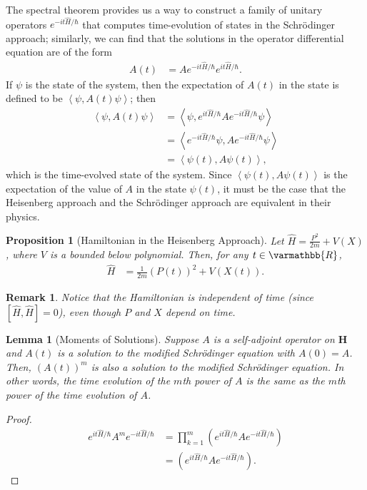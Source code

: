 \documentclass[12pt]{extarticle}
\newtheorem*{remark}{Remark}
\newcommand{\R}{\varmathbb{R}}
\newcommand{\iprod}[2]{\left\langle #1,#2\right\rangle}
\theoremstyle{plain}
\newtheorem*{lemma}{Lemma}%
\newtheorem*{proposition}{Proposition}%
\theoremstyle{definition}
\theoremstyle{remark}
\begin{document}
  The spectral theorem provides us a way to construct a family of unitary operators $e^{-it\hat{H}/\hbar}$ that computes time-evolution of states in the Schrödinger approach; similarly, we can find that the solutions in the operator differential equation are of the form
  \begin{align*}
    A(t) &= Ae^{-it\hat{H}/\hbar}e^{it\hat{H}/\hbar}.
  \end{align*}
  If $\psi$ is the state of the system, then the expectation of $A(t)$ in the state is defined to be $\iprod{\psi}{A(t)\psi}$; then
  \begin{align*}
    \iprod{\psi}{A(t)\psi} &= \iprod{\psi}{e^{it\hat{H}/\hbar}Ae^{-it\hat{H}/\hbar}\psi}\\
                           &= \iprod{e^{-it\hat{H}/\hbar}\psi}{Ae^{-it\hat{H}/\hbar}\psi}\\
                           &= \iprod{\psi(t)}{A\psi(t)},
  \end{align*}
  which is the time-evolved state of the system. Since $\iprod{\psi(t)}{A\psi(t)}$ is the expectation of the value of $A$ in the state $\psi(t)$, it must be the case that the Heisenberg approach and the Schrödinger approach are equivalent in their physics.
  \begin{proposition}[Hamiltonian in the Heisenberg Approach]
    Let $\hat{H} = \frac{P^2}{2m} + V(X)$, where $V$ is a bounded below polynomial. Then, for any $t\in \R$,
    \begin{align*}
      \hat{H} &= \frac{1}{2m}\left(P(t)\right)^2 + V(X(t)).
    \end{align*}
  \end{proposition}
  \begin{remark}
    Notice that the Hamiltonian is independent of time (since $[\hat{H},\hat{H}] = 0$), even though $P$ and $X$ depend on time.
  \end{remark}
  \begin{lemma}[Moments of Solutions]
    Suppose $A$ is a self-adjoint operator on $\mathbf{H}$ and $A(t)$ is a solution to the modified Schrödinger equation with $A(0) = A$. Then, $\left(A(t)\right)^m$ is also a solution to the modified Schrödinger equation. In other words, the time evolution of the $m$th power of $A$ is the same as the $m$th power of the time evolution of $A$.
  \end{lemma}
  \begin{proof}
    \begin{align*}
      e^{it\hat{H}/\hbar}A^{m}e^{-it\hat{H}/\hbar} &= \prod_{k=1}^{m}\left(e^{it\hat{H}/\hbar}Ae^{-it\hat{H}/\hbar}\right)\\
                                                   &= \left(e^{it\hat{H}/\hbar}Ae^{-it\hat{H}/\hbar}\right).
    \end{align*}
  \end{proof}
\end{document}
